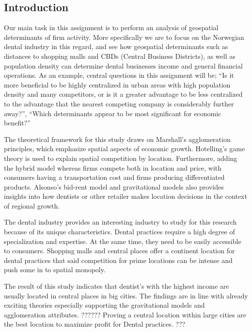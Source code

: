 \documentclass[
  10,
  a4paper,
]{article}
\begin{document}
\hypertarget{introduction}{%
\subsection{Introduction}\label{introduction}}

Our main task in this assignment is to perform an analysis of geospatial
determinants of firm activity. More specifically we are to focus on the
Norwegian dental industry in this regard, and see how geospatial
determinants such as distances to shopping malls and CBDs (Central
Business Districts), as well as population density can determine dental
businesses income and general financial operations. As an example,
central questions in this assignment will be; ``Is it more beneficial to
be highly centralized in urban areas with high population density and
many competitors, or is it a greater advantage to be less centralized to
the advantage that the nearest competing company is considerably further
away?'', ``Which determinants appear to be most significant for economic
benefit?''

The theoretical framework for this study draws on Marshall's
agglomeration principles, which emphasize spatial aspects of economic
growth. Hotelling's game theory is used to explain spatial competition
by location. Furthermore, adding the hybrid model whereas firms compete
both in location and price, with consumers having a transportation cost
and firms producing differentiated products. Alsonso's bid-rent model
and gravitational models also provides insights into how dentists or
other retailer makes location decisions in the context of regional
growth.

The dental industry provides an interesting industry to study for this
research because of its unique characteristics. Dental practices require
a high degree of specialization and expertise. At the same time, they
need to be easily accessible to consumers. Shopping malls and central
places offer a continent location for dental practices that said
competition for prime locations can be intense and push some in to
spatial monopoly.

The result of this study indicates that dentist's with the highest
income are usually located in central places in big cities. The findings
are in line with already exciting theories especially supporting the
gravitational models and agglomeration attributes. ?????? Proving a
central location within large cities are the best location to maximize
profit for Dental practices. ???
\end{document}
